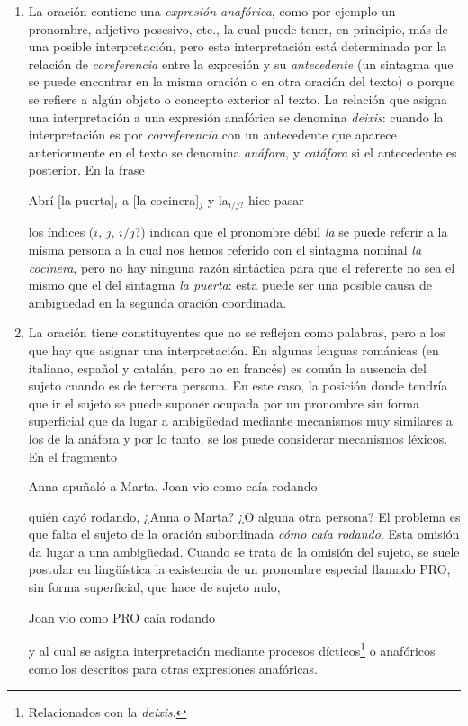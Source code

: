 \begin{enumerate}
\item La oración contiene una \emph{expresión anafórica}, como por ejemplo un pronombre, adjetivo posesivo, etc., la cual puede tener, en principio, más de una posible interpretación, pero esta interpretación está determinada por la relación de \emph{coreferencia} entre la expresión y su \emph{antecedente} (un sintagma que se puede encontrar en la misma oración o en otra oración del texto) o porque se refiere a algún objeto o concepto exterior al texto. La relación que asigna una interpretación a una expresión anafórica se denomina \emph{deixis}: cuando la interpretación es por \emph{correferencia} con un antecedente que aparece anteriormente en el texto se denomina \emph{anáfora}\label{pg:anafora}, y \emph{catáfora} si el antecedente es posterior. En la frase \begin{exemple} Abrí [la puerta]$_i$ a [la cocinera]$_j$ y la$_{i/j?}$ hice pasar \end{exemple} los índices ($i$, $j$, $i/j?$) indican que el pronombre débil \emph{la } se puede referir a la misma persona a la cual nos hemos referido con el sintagma nominal \emph{la cocinera}, pero no hay ninguna razón sintáctica para que el referente no sea el mismo que el del sintagma \emph{la puerta}: esta puede ser una posible causa de ambigüedad en la segunda oración coordinada. 

\item La oración tiene constituyentes que no se reflejan como palabras, pero a los que hay que asignar una interpretación. En algunas lenguas románicas (en italiano, español y catalán, pero no en francés) es común la ausencia del sujeto cuando es de tercera persona. En este caso, la posición donde tendría que ir el sujeto se puede suponer ocupada por un pronombre sin forma superficial que da lugar a ambigüedad mediante mecanismos muy similares a los de la anáfora y por lo tanto, se los puede considerar mecanismos léxicos. En el fragmento \begin{exemple} Anna apuñaló a Marta. Joan vio como caía rodando \end{exemple} quién cayó rodando, ¿Anna o Marta? ¿O alguna otra persona? El problema es que falta el sujeto de la oración subordinada \emph{cómo caía rodando}. Esta omisión da lugar a una ambigüedad. Cuando se trata de la omisión del sujeto, se suele postular en lingüística la existencia de un pronombre especial llamado PRO, sin forma superficial, que hace de sujeto nulo, \begin{exemple} Joan vio como PRO caía rodando \end{exemple} y al cual se asigna interpretación mediante procesos dícticos\footnote{Relacionados con la \emph{deixis}.} o anafóricos como los descritos para otras expresiones anafóricas. 


\end{enumerate}
